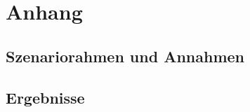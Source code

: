 \appendix

\section{Anhang}

\subsection{Szenariorahmen und Annahmen}









\subsection{Ergebnisse}




